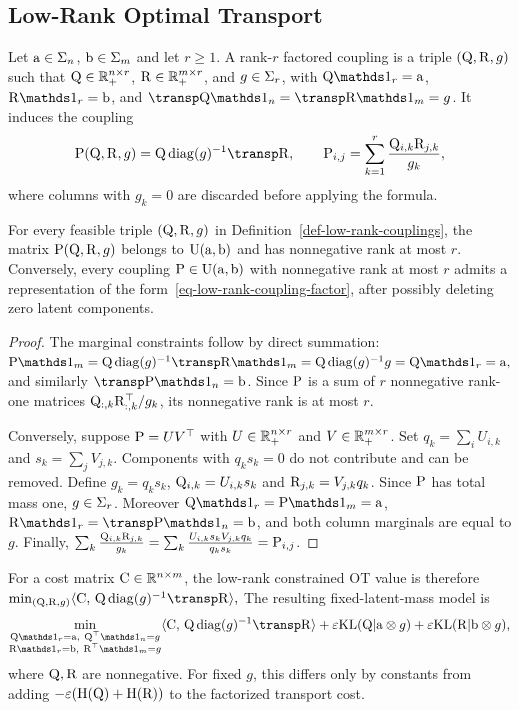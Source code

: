 \subsection{Low-Rank Optimal Transport}
\label{sec-low-rank-ot}
\begin{defn}\label{def-low-rank-couplings}
Let $\a\in\simplex_n$, $\b\in\simplex_m$ and let $r\geq1$. A rank-$r$ factored coupling is a triple $(\Q,\R,g)$ such that
$\Q\in\RR_+^{n\times r}$, $\R\in\RR_+^{m\times r}$, and $g\in\simplex_r$,
with
$\Q\ones_r=\a$, $\R\ones_r=\b$, and $\transp \Q\ones_n=\transp \R\ones_m=g$.
It induces the coupling
\begin{equation}\label{eq-low-rank-coupling-factor}
\P(\Q,\R,g)
=
\Q\diag(g)^{-1}\transp \R,
\qquad
\P_{i,j}=\sum_{k=1}^r \frac{\Q_{i,k}\R_{j,k}}{g_k},
\end{equation}
where columns with $g_k=0$ are discarded before applying the formula.
\end{defn}
\begin{prop}\label{prop-low-rank-factorization}
For every feasible triple $(\Q,\R,g)$ in Definition~\ref{def-low-rank-couplings}, the matrix $\P(\Q,\R,g)$ belongs to $\CouplingsD(\a,\b)$ and has nonnegative rank at most $r$. Conversely, every coupling $\P\in\CouplingsD(\a,\b)$ with nonnegative rank at most $r$ admits a representation of the form~\eqref{eq-low-rank-coupling-factor}, after possibly deleting zero latent components.
\end{prop}
\begin{proof}
The marginal constraints follow by direct summation: \(\P\ones_m=\Q\diag(g)^{-1}\transp \R\ones_m =\Q\diag(g)^{-1}g=\Q\ones_r=\a,\)
and similarly $\transp \P\ones_n=\b$. Since $\P$ is a sum of $r$ nonnegative rank-one matrices $\Q_{:,k}\R_{:,k}^\top/g_k$, its nonnegative rank is at most $r$.

Conversely, suppose $\P=UV^\top$ with $U\in\RR_+^{n\times r}$ and $V\in\RR_+^{m\times r}$. Set $q_k=\sum_i U_{i,k}$ and $s_k=\sum_j V_{j,k}$. Components with $q_ks_k=0$ do not contribute and can be removed. Define $g_k=q_ks_k$, $\Q_{i,k}=U_{i,k}s_k$ and $\R_{j,k}=V_{j,k}q_k$. Since $\P$ has total mass one, $g\in\simplex_r$. Moreover $\Q\ones_r=\P\ones_m=\a$, $\R\ones_r=\transp \P\ones_n=\b$, and both column marginals are equal to $g$. Finally,
$\sum_k\frac{\Q_{i,k}\R_{j,k}}{g_k} = \sum_k\frac{U_{i,k}s_kV_{j,k}q_k}{q_ks_k} =\P_{i,j}$.
\end{proof}
For a cost matrix $\C\in\RR^{n\times m}$, the low-rank constrained OT value is therefore
\(\min_{(\Q,\R,g)} \dotp{\C}{\Q\diag(g)^{-1}\transp \R},\)
The resulting fixed-latent-mass model is
\begin{equation}\label{eq-low-rank-entropic-ot}
\min_{\substack{\Q\ones_r=\a,\ \Q^\top\ones_n=g\\
\R\ones_r=\b,\ \R^\top\ones_m=g}}
\dotp{\C}{\Q\diag(g)^{-1}\transp \R}
+
\epsilon\KLD(\Q|\a\otimes g)
+
\epsilon\KLD(\R|\b\otimes g),
\end{equation}
where $\Q,\R$ are nonnegative. For fixed $g$, this differs only by constants from adding $-\epsilon(\HD(\Q)+\HD(\R))$ to the factorized transport cost.

